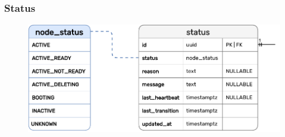 \subsubsection{Status}
\label{subsubsec:implementation_server_database_status}

\begin{figure}[htbp]
  \centering
  \includegraphics[width=.75\textwidth]{images/implementation/erm_status.pdf}
\end{figure}

